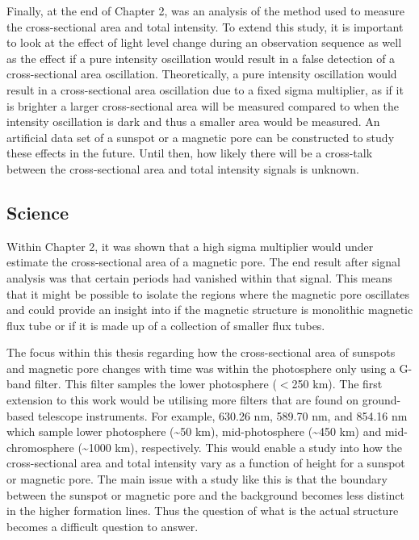     Finally, at the end of Chapter 2, was an analysis of the method used to measure the cross-sectional area and total intensity.
    To extend this study, it is important to look at the effect of light level change during an observation sequence as well as the effect if a pure intensity oscillation would result in a false detection of a cross-sectional area oscillation. 
    Theoretically, a pure intensity oscillation would result in a cross-sectional area oscillation due to a fixed sigma multiplier, as if it is brighter a larger cross-sectional area will be measured compared to when the intensity oscillation is dark and thus a smaller area would be measured.
    An artificial data set of a sunspot or a magnetic pore can be constructed to study these effects in the future.  
    Until then, how likely there will be a cross-talk between the cross-sectional area and total intensity signals is unknown.
                
    \subsection{Science}
 
	Within Chapter 2, it was shown that a high sigma multiplier would under estimate the cross-sectional area of a magnetic pore.
	The end result after signal analysis was that certain periods had vanished within that signal.
	This means that it might be possible to isolate the regions where the magnetic pore oscillates and could provide an insight into if the magnetic structure is  monolithic magnetic flux tube or if it is made up of a collection of smaller flux tubes.
 
    The focus within this thesis regarding how the cross-sectional area of sunspots and magnetic pore changes with time was within the photosphere only using a G-band filter.
    This filter samples the lower photosphere ($<$250 km).
    The first extension to this work would be utilising more filters that are found on ground-based telescope instruments.
    For example,  630.26 nm,  589.70 nm, and  854.16 nm which sample lower photosphere (\textasciitilde50 km), mid-photosphere (\textasciitilde 450 km) and mid-chromosphere (\textasciitilde1000 km), respectively.
    This would enable a study into how the cross-sectional area and total intensity vary as a function of height for a sunspot or magnetic pore. 
    The main issue with a study like this is that the boundary between the sunspot or magnetic pore and the background becomes less distinct in the higher formation lines.
    Thus the question of what is the actual structure becomes a difficult question to answer.
 

